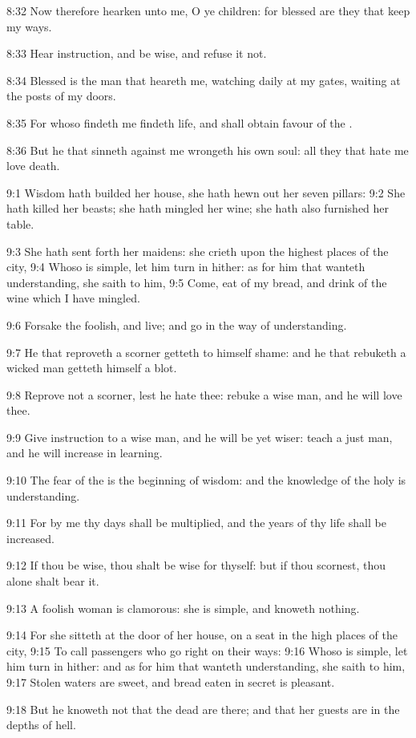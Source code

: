 8:32 Now therefore hearken unto me, O ye children: for blessed are
they that keep my ways.

8:33 Hear instruction, and be wise, and refuse it not.

8:34 Blessed is the man that heareth me, watching daily at my gates,
waiting at the posts of my doors.

8:35 For whoso findeth me findeth life, and shall obtain favour of the
\LORD.

8:36 But he that sinneth against me wrongeth his own soul: all they
that hate me love death.

9:1 Wisdom hath builded her house, she hath hewn out her seven
pillars: 9:2 She hath killed her beasts; she hath mingled her wine;
she hath also furnished her table.

9:3 She hath sent forth her maidens: she crieth upon the highest
places of the city, 9:4 Whoso is simple, let him turn in hither: as
for him that wanteth understanding, she saith to him, 9:5 Come, eat of
my bread, and drink of the wine which I have mingled.

9:6 Forsake the foolish, and live; and go in the way of understanding.

9:7 He that reproveth a scorner getteth to himself shame: and he that
rebuketh a wicked man getteth himself a blot.

9:8 Reprove not a scorner, lest he hate thee: rebuke a wise man, and
he will love thee.

9:9 Give instruction to a wise man, and he will be yet wiser: teach a
just man, and he will increase in learning.

9:10 The fear of the \LORD is the beginning of wisdom: and the
knowledge of the holy is understanding.

9:11 For by me thy days shall be multiplied, and the years of thy life
shall be increased.

9:12 If thou be wise, thou shalt be wise for thyself: but if thou
scornest, thou alone shalt bear it.

9:13 A foolish woman is clamorous: she is simple, and knoweth nothing.

9:14 For she sitteth at the door of her house, on a seat in the high
places of the city, 9:15 To call passengers who go right on their
ways: 9:16 Whoso is simple, let him turn in hither: and as for him
that wanteth understanding, she saith to him, 9:17 Stolen waters are
sweet, and bread eaten in secret is pleasant.

9:18 But he knoweth not that the dead are there; and that her guests
are in the depths of hell.


